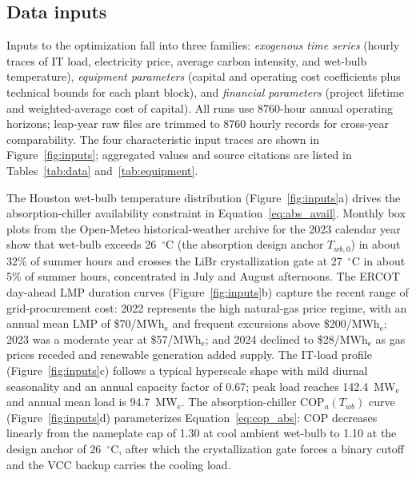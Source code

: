 \documentclass[a4paper,fleqn]{cas-sc}
\begin{document}
\subsection{Data inputs}
\label{sec:methods:data}

Inputs to the optimization fall into three families: \emph{exogenous time series} (hourly traces of IT load, electricity price, average carbon intensity, and wet-bulb temperature), \emph{equipment parameters} (capital and operating cost coefficients plus technical bounds for each plant block), and \emph{financial parameters} (project lifetime and weighted-average cost of capital). All runs use 8760-hour annual operating horizons; leap-year raw files are trimmed to 8760 hourly records for cross-year comparability. The four characteristic input traces are shown in Figure~\ref{fig:inputs}; aggregated values and source citations are listed in Tables~\ref{tab:data} and~\ref{tab:equipment}.

The Houston wet-bulb temperature distribution (Figure~\ref{fig:inputs}a) drives the absorption-chiller availability constraint in Equation~\eqref{eq:abs_avail}. Monthly box plots from the Open-Meteo historical-weather archive for the 2023 calendar year show that wet-bulb exceeds 26~$^\circ$C (the absorption design anchor $T_{wb,0}$) in about 32\% of summer hours and crosses the LiBr crystallization gate at 27~$^\circ$C in about 5\% of summer hours, concentrated in July and August afternoons. The ERCOT day-ahead LMP duration curves (Figure~\ref{fig:inputs}b) capture the recent range of grid-procurement cost: 2022 represents the high natural-gas price regime, with an annual mean LMP of \$70/MWh$_\mathrm{e}$ and frequent excursions above \$200/MWh$_\mathrm{e}$; 2023 was a moderate year at \$57/MWh$_\mathrm{e}$; and 2024 declined to \$28/MWh$_\mathrm{e}$ as gas prices receded and renewable generation added supply. The IT-load profile (Figure~\ref{fig:inputs}c) follows a typical hyperscale shape with mild diurnal seasonality and an annual capacity factor of 0.67; peak load reaches 142.4~MW$_\mathrm{e}$ and annual mean load is 94.7~MW$_\mathrm{e}$. The absorption-chiller COP$_a(T_{wb})$ curve (Figure~\ref{fig:inputs}d) parameterizes Equation~\eqref{eq:cop_abs}: COP decreases linearly from the nameplate cap of 1.30 at cool ambient wet-bulb to 1.10 at the design anchor of 26~$^\circ$C, after which the crystallization gate forces a binary cutoff and the VCC backup carries the cooling load.
\end{document}
